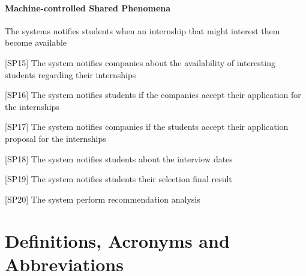 				\paragraph{Machine-controlled Shared Phenomena}
					\begin{flushleft}
						[SP14] The systems notifies students when an internship that might interest them become available
						
						[SP15] The system notifies companies about the availability of interesting students regarding their internships
						
						[SP16] The system notifies students if the companies accept their application for the internships
						
						[SP17] The system notifies companies if the students accept their application proposal for the internships
						
						[SP18] The system notifies students about the interview dates
						
						[SP19] The system notifies students their selection final result
						
						[SP20] The system perform recommendation analysis
					\end{flushleft} 
					
	\section{Definitions, Acronyms and Abbreviations}

